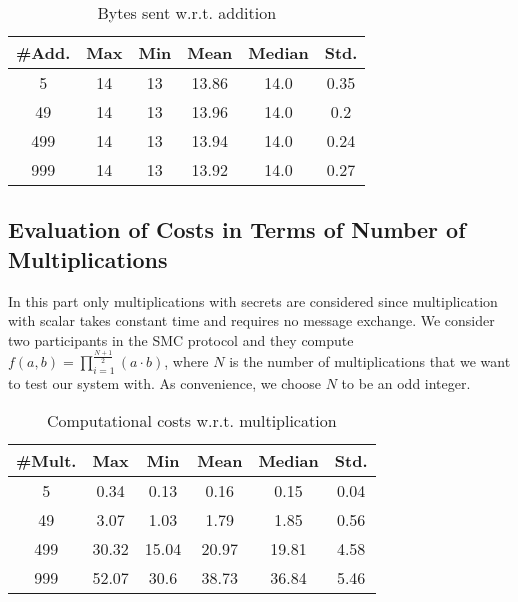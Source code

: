 \documentclass[9pt,conference]{IEEEtran}
\begin{document}
\begin{table}[H]
\caption{Bytes sent w.r.t. addition} %
\centering %
\begin{tabular}{c c c c c c} %
\hline\hline %
\#Add. & Max & Min & Mean & Median & Std.\\ [0.5ex] %
\hline %
5 & 14  & 13 & 13.86 & 14.0 & 0.35 \\ %
49 &14 &13 &13.96 &14.0 &0.2    \\
499 &14 &13 &13.94 &14.0 &0.24 \\
999 &14 &13 &13.92 &14.0 &0.27\\ [1ex] %
\hline %
\end{tabular}
\label{table:numberadditionsb} %
\end{table}

\subsection{Evaluation of Costs in Terms of Number of Multiplications}
In this part only multiplications with secrets are considered since multiplication with scalar takes constant time and requires no message exchange. We consider two participants in the SMC protocol and they compute $f(a,b)=\prod_{i=1}^{\frac{N+1}{2}}(a \cdot b)$, where $N$ is the number of multiplications that we want to test our system with. As convenience, we choose $N$ to be an odd integer.

\begin{table}[H]
\caption{Computational costs w.r.t. multiplication} %
\centering %
\begin{tabular}{c c c c c c} %
\hline\hline %
\#Mult. & Max & Min & Mean & Median & Std. \\ [0.5ex] %
\hline %
5 & 0.34  & 0.13 & 0.16  & 0.15  & 0.04  \\ %
49 &3.07 &1.03 &1.79 &1.85 &0.56    \\
499 & 30.32 & 15.04 & 20.97 & 19.81 & 4.58 \\
999 & 52.07 & 30.6 & 38.73 & 36.84 & 5.46 \\ [1ex] %
\hline %
\end{tabular}
\label{table:numbermultcc} %
\end{table}
\end{document}
